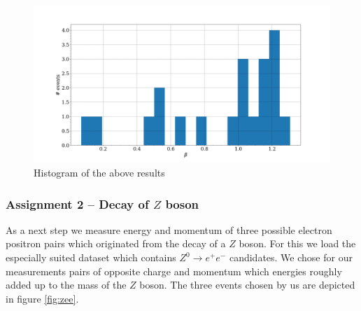 \documentclass[11pt,a4paper,notitlepage]{scrartcl}
\begin{document}
\begin{figure}
	\centering
	\includegraphics[width=\linewidth]{plots/beta_histo}
	\caption{Histogram of the above results}
	\label{fig:resbeta}
\end{figure}

\subsubsection{Assignment 2 -- Decay of $Z$ boson}
As a next step we measure energy and momentum of three possible electron positron pairs which originated from the decay of a $Z$ boson. For this we load the especially suited dataset which contains $Z^0\to e^+e^-$ candidates. We chose for our measurements pairs of opposite charge and momentum which energies roughly added up to the mass of the $Z$ boson. The three events chosen by us are depicted in figure \ref{fig:zee}.
\end{document}
